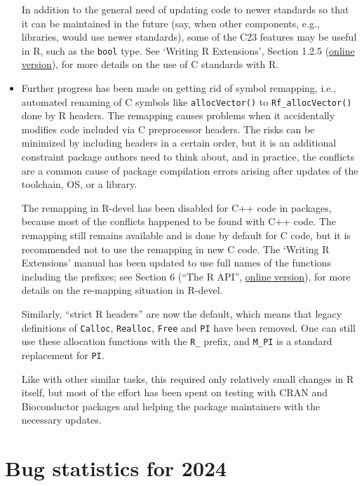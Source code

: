 \begin{itemize}
  In addition to the general need of updating code to newer standards so
  that it can be maintained in the future (say, when other components, e.g.,
  libraries, would use newer standards), some of the C23 features may be useful in R,
  such as the \texttt{bool} type. See `Writing R Extensions',
  Section 1.2.5 (\href{https://CRAN.R-project.org/doc/manuals/r-devel/R-exts.html\#C-standards}{online version}),
  for more details on the use of C standards with R.
\item
  Further progress has been made on getting rid of symbol remapping, i.e.,
  automated renaming of C symbols like \texttt{allocVector()} to \texttt{Rf\_allocVector()}
  done by R headers. The remapping causes problems when it accidentally
  modifies code included via C preprocessor headers. The risks can be
  minimized by including headers in a certain order, but it is an additional
  constraint package authors need to think about, and in practice, the
  conflicts are a common cause of package compilation errors arising after
  updates of the toolchain, OS, or a library.

  The remapping in R-devel has been disabled for C++ code in packages,
  because most of the conflicts happened to be found with C++ code. The
  remapping still remains available and is done by default for C code, but
  it is recommended not to use the remapping in new C code. The `Writing R
  Extensions' manual has been updated to use full names of the functions
  including the prefixes; see Section 6 (``The R API'',
  \href{https://CRAN.R-project.org/doc/manuals/r-devel/R-exts.html\#The-R-API}{online version}),
  for more details on the re-mapping situation in R-devel.

  Similarly, ``strict R headers'' are now the default, which means that legacy
  definitions of \texttt{Calloc}, \texttt{Realloc}, \texttt{Free} and \texttt{PI} have been removed. One
  can still use these allocation functions with the \texttt{R\_} prefix, and \texttt{M\_PI} is a
  standard replacement for \texttt{PI}.

  Like with other similar tasks, this required only relatively small changes
  in R itself, but most of the effort has been spent on testing with CRAN
  and Bioconductor packages and helping the package maintainers with the
  necessary updates.
\end{itemize}

\section{Bug statistics for 2024}\label{bug-statistics-for-2024}


